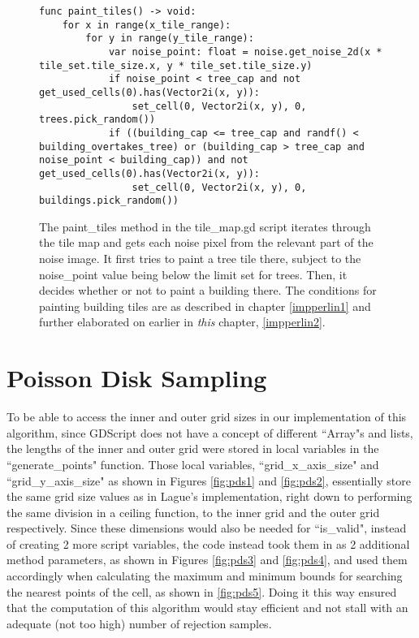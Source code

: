 \begin{figure}[H]
    \centering
    \begin{lstlisting}
func paint_tiles() -> void:
	for x in range(x_tile_range):
		for y in range(y_tile_range):
			var noise_point: float = noise.get_noise_2d(x * tile_set.tile_size.x, y * tile_set.tile_size.y)
			if noise_point < tree_cap and not get_used_cells(0).has(Vector2i(x, y)):
				set_cell(0, Vector2i(x, y), 0, trees.pick_random())
			if ((building_cap <= tree_cap and randf() < building_overtakes_tree) or (building_cap > tree_cap and noise_point < building_cap)) and not get_used_cells(0).has(Vector2i(x, y)):
				set_cell(0, Vector2i(x, y), 0, buildings.pick_random())
    \end{lstlisting}
    \caption{The paint\_tiles method in the tile\_map.gd script iterates through the tile map and gets each noise pixel from the relevant part of the noise image. It first tries to paint a tree tile there, subject to the noise\_point value being below the limit set for trees. Then, it decides whether or not to paint a building there. The conditions for painting building tiles are as described in chapter \ref{impperlin1} and further elaborated on earlier in \textit{this} chapter, \ref{impperlin2}.}
    \label{fig:simplex3}
\end{figure}

\section{Poisson Disk Sampling}

To be able to access the inner and outer grid sizes in our implementation of this algorithm, since GDScript does not have a concept of different ``Array"s and lists, the lengths of the inner and outer grid were stored in local variables in the ``generate\_points" function. Those local variables, ``grid\_x\_axis\_size" and ``grid\_y\_axis\_size" as shown in Figures \ref{fig:pds1} and \ref{fig:pds2}, essentially store the same grid size values as in Lague's implementation, right down to performing the same division in a ceiling function, to the inner grid and the outer grid respectively. Since these dimensions would also be needed for ``is\_valid", instead of creating 2 more script variables, the code instead took them in as 2 additional method parameters, as shown in Figures \ref{fig:pds3} and \ref{fig:pds4}, and used them accordingly when calculating the maximum and minimum bounds for searching the nearest points of the cell, as shown in \ref{fig:pds5}. Doing it this way ensured that the computation of this algorithm would stay efficient and not stall with an adequate (not too high) number of rejection samples.

